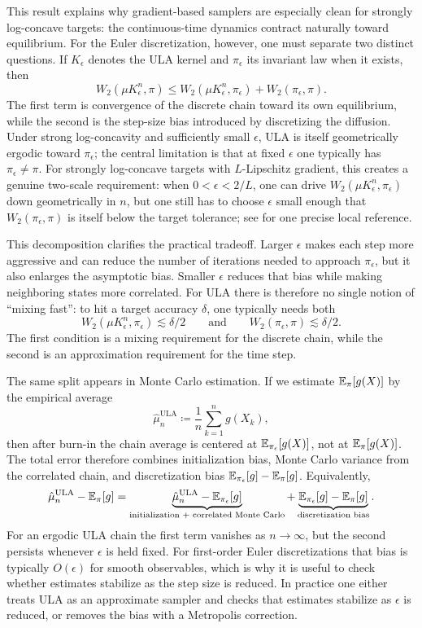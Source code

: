 This result explains why gradient-based samplers are especially clean for strongly log-concave targets: the continuous-time dynamics contract naturally toward equilibrium.
For the Euler discretization, however, one must separate two distinct questions.
If \(K_\epsilon\) denotes the ULA kernel and \(\pi_\epsilon\) its invariant law when it exists, then
\[
  W_2(\mu K_\epsilon^n,\pi)
  \le
  W_2(\mu K_\epsilon^n,\pi_\epsilon)
  +
  W_2(\pi_\epsilon,\pi).
\]
The first term is convergence of the discrete chain toward its own equilibrium, while the second is the step-size bias introduced by discretizing the diffusion.
Under strong log-concavity and sufficiently small \(\epsilon\), ULA is itself geometrically ergodic toward \(\pi_\epsilon\); the central limitation is that at fixed \(\epsilon\) one typically has \(\pi_\epsilon\neq\pi\).
For strongly log-concave targets with \(L\)-Lipschitz gradient, this creates a genuine two-scale requirement: when \(0<\epsilon<2/L\), one can drive \(W_2(\mu K_\epsilon^n,\pi_\epsilon)\) down geometrically in \(n\), but one still has to choose \(\epsilon\) small enough that \(W_2(\pi_\epsilon,\pi)\) is itself below the target tolerance; see \citet[Thm.~1 and \S7.1]{vempala_wibisono_2019_ula_isoperimetry} for one precise local reference.

This decomposition clarifies the practical tradeoff.
Larger \(\epsilon\) makes each step more aggressive and can reduce the number of iterations needed to approach \(\pi_\epsilon\), but it also enlarges the asymptotic bias.
Smaller \(\epsilon\) reduces that bias while making neighboring states more correlated.
For ULA there is therefore no single notion of ``mixing fast'': to hit a target accuracy \(\delta\), one typically needs both
\[
  W_2(\mu K_\epsilon^n,\pi_\epsilon)\lesssim \delta/2
  \qquad\text{and}\qquad
  W_2(\pi_\epsilon,\pi)\lesssim \delta/2.
\]
The first condition is a mixing requirement for the discrete chain, while the second is an approximation requirement for the time step.

The same split appears in Monte Carlo estimation.
If we estimate \(\mathbb{E}_\pi[g(X)]\) by the empirical average
\[
  \hat\mu_n^{\mathrm{ULA}}
  \coloneqq
  \frac{1}{n}\sum_{k=1}^n g(X_k),
\]
then after burn-in the chain average is centered at \(\mathbb{E}_{\pi_\epsilon}[g(X)]\), not at \(\mathbb{E}_\pi[g(X)]\).
The total error therefore combines initialization bias, Monte Carlo variance from the correlated chain, and discretization bias \(\mathbb{E}_{\pi_\epsilon}[g]-\mathbb{E}_\pi[g]\).
Equivalently,
\[
  \hat\mu_n^{\mathrm{ULA}}-\mathbb{E}_\pi[g]
  =
  \underbrace{\hat\mu_n^{\mathrm{ULA}}-\mathbb{E}_{\pi_\epsilon}[g]}_{\text{initialization + correlated Monte Carlo}}
  +
  \underbrace{\mathbb{E}_{\pi_\epsilon}[g]-\mathbb{E}_\pi[g]}_{\text{discretization bias}}.
\]
For an ergodic ULA chain the first term vanishes as \(n\to\infty\), but the second persists whenever \(\epsilon\) is held fixed.
For first-order Euler discretizations that bias is typically \(O(\epsilon)\) for smooth observables, which is why it is useful to check whether estimates stabilize as the step size is reduced.
In practice one either treats ULA as an approximate sampler and checks that estimates stabilize as \(\epsilon\) is reduced, or removes the bias with a Metropolis correction.

